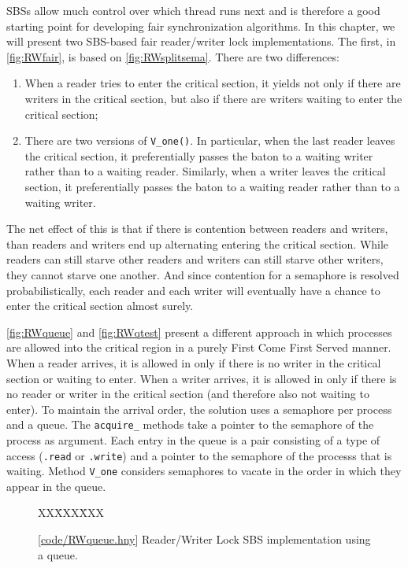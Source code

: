 \documentclass{report}
\newcommand{\harmonysource}[1]{
\begin{tabbing}
XX\=XXX\=XXX\kill
    
\end{tabbing}
}
\newcommand{\harmonylink}[1]{%
[\href{https://www.cs.cornell.edu/home/rvr/harmony/#1}{\underline{#1}}]%
}
\newenvironment{code}{
\tcolorbox
}{
\endtcolorbox
}
\begin{document}
SBSs allow much control over which thread runs next and is therefore a
good starting point for developing fair synchronization algorithms.
In this chapter, we will present two SBS-based fair reader/writer lock
implementations.
The first, in \autoref{fig:RWfair}, is based on \autoref{fig:RWsplitsema}.
There are two differences:

\begin{enumerate}
\item When a reader tries to enter the critical section, it yields not only
if there are writers in the critical section, but also if there are writers
waiting to enter the critical section;
\item There are two versions of \texttt{V\_one()}.  In particular, when the
last reader leaves the critical section, it preferentially passes the baton
to a waiting writer rather than to a waiting reader.  Similarly,
when a writer leaves the critical section, it preferentially passes
the baton to a waiting reader rather than to a waiting writer.
\end{enumerate}

The net effect of this is that if there is contention between readers and
writers, than readers and writers end up alternating entering the critical
section.  While readers can still starve other readers and writers can still
starve other writers, they cannot starve one another.  And since contention for
a semaphore is resolved probabilistically, each reader and each writer will
eventually have a chance to enter the critical section almost surely.

\autoref{fig:RWqueue} and \autoref{fig:RWqtest} present a different approach
in which processes are allowed into the critical region in a purely First
Come First Served manner.  When a reader arrives, it is allowed in only if
there is no writer in the critical section or waiting to enter.  When a writer
arrives, it is allowed in only if there is no reader or writer in the
critical section (and therefore also not waiting to enter).  To maintain the
arrival order, the solution uses a semaphore per process and a queue.
The \texttt{acquire\_} methods take a pointer to
the semaphore of the process as argument.
Each entry in the queue is a pair consisting of a type of access
(\texttt{.read} or \texttt{.write}) and a pointer to the semaphore of the
processs that is waiting.  Method \texttt{V\_one} considers semaphores to vacate
in the order in which they appear in the queue.

\begin{figure}
\begin{code}
{\small
\harmonysource{RWqueue}
}
\end{code}
\caption{\harmonylink{code/RWqueue.hny} Reader/Writer Lock SBS implementation using a queue.}
\label{fig:RWqueue}
\end{figure}
\end{document}

